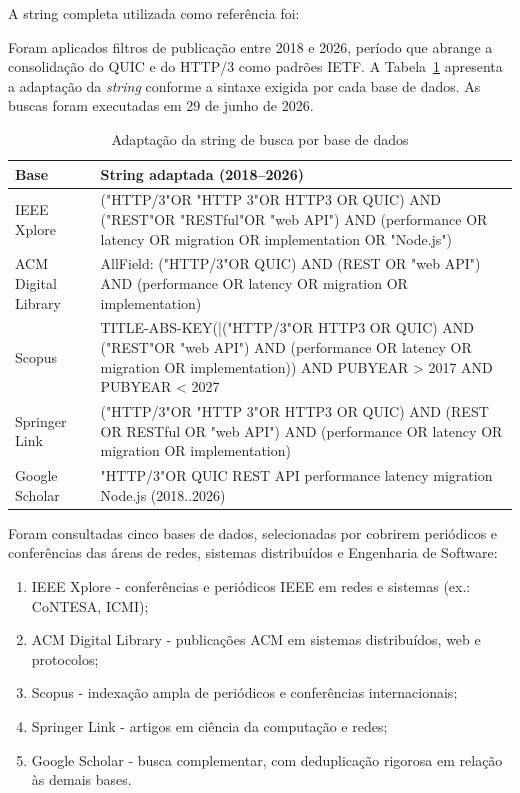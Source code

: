 A string completa utilizada como referência foi:

\begin{sloppypar}
\end{sloppypar}

Foram aplicados filtros de publicação entre 2018 e 2026, período que abrange a consolidação do QUIC e do HTTP/3 como padrões IETF. A Tabela~\ref{tab:string-busca} apresenta a adaptação da \textit{string} conforme a sintaxe exigida por cada base de dados. As buscas foram executadas em 29 de junho de 2026.

\begin{table}[htbp]
\centering
\caption{Adaptação da string de busca por base de dados}\label{tab:string-busca}
\small
\setlength{\tabcolsep}{3pt}
\begin{tabular}{@{}>{\raggedright\arraybackslash}p{32mm}>{\raggedright\arraybackslash}p{112mm}@{}}
\hline
\textbf{Base} & \textbf{String adaptada (2018--2026)} \\
\hline
IEEE Xplore & ("HTTP/3"OR "HTTP 3"OR HTTP3 OR QUIC) AND ("REST"OR "RESTful"OR "web API") AND (performance OR latency OR migration OR implementation OR "Node.js") \\
ACM Digital Library & AllField: ("HTTP/3"OR QUIC) AND (REST OR "web API") AND (performance OR latency OR migration OR implementation) \\
Scopus & TITLE-ABS-KEY(|("HTTP/3"OR HTTP3 OR QUIC) AND ("REST"OR "web API") AND (performance OR latency OR migration OR implementation)) AND PUBYEAR > 2017 AND PUBYEAR < 2027 \\
Springer Link & ("HTTP/3"OR "HTTP 3"OR HTTP3 OR QUIC) AND (REST OR RESTful OR "web API") AND (performance OR latency OR migration OR implementation) \\
Google Scholar & "HTTP/3"OR QUIC REST API performance latency migration Node.js (2018..2026) \\
\hline
\end{tabular}
\end{table}

Foram consultadas cinco bases de dados, selecionadas por cobrirem periódicos e conferências das áreas de redes, sistemas distribuídos e Engenharia de Software:

\begin{enumerate}[label=\alph*)]
\item IEEE Xplore - conferências e periódicos IEEE em redes e sistemas (ex.: CoNTESA, ICMI);
\item ACM Digital Library - publicações ACM em sistemas distribuídos, web e protocolos;
\item Scopus - indexação ampla de periódicos e conferências internacionais;
\item Springer Link - artigos em ciência da computação e redes;
\item Google Scholar - busca complementar, com deduplicação rigorosa em relação às demais bases.
\end{enumerate}

